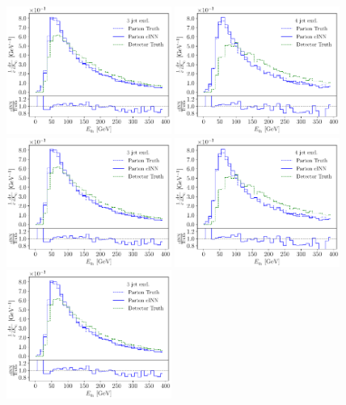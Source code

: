 \begin{figure}[t]
\includegraphics[page = 9, width=0.48\textwidth]{figures/cINN/isr_3jonly_test_ratio}
\includegraphics[page = 9, width=0.48\textwidth]{figures/cINN/isr_4jonly_test_ratio} \\
\includegraphics[page =10, width=0.48\textwidth]{figures/cINN/isr_3jonly_test_ratio}
\includegraphics[page =10, width=0.48\textwidth]{figures/cINN/isr_4jonly_test_ratio} \\
\includegraphics[page =19, width=0.48\textwidth]{figures/cINN/isr_3jonly_test_ratio}

\end{figure}
